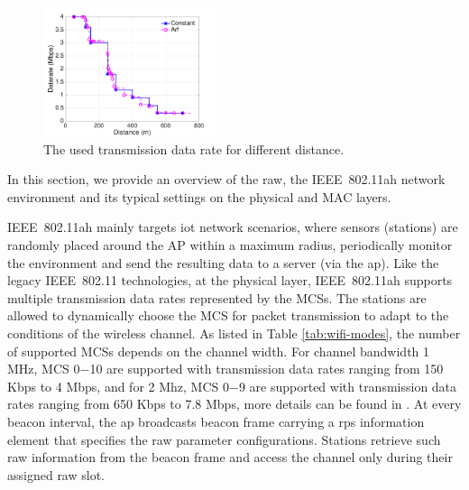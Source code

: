 \begin{figure}[t]
  \centering
  \includegraphics[width=0.45\textwidth]{figures/distance-datarate-512bytes}  \caption{The used transmission data rate for different distance. \label{fig:dist-datarate}}
\end{figure}

In this section, we provide an overview of the \gls{raw}, the IEEE~802.11ah network environment and its typical settings on the physical and MAC layers. 



IEEE~802.11ah mainly targets \gls{iot} network scenarios, where sensors (stations) are randomly placed around the AP within a maximum radius, periodically monitor the environment and send the resulting data to a server (via the \gls{ap}). Like the legacy IEEE~802.11 technologies, at the physical layer, IEEE~802.11ah supports multiple transmission data rates represented by the MCSs. The stations are allowed to dynamically choose the MCS for packet transmission to adapt to the conditions of the wireless channel. As listed in Table \ref{tab:wifi-modes}, the number of supported MCSs depends on the channel width. For channel bandwidth 1 MHz,  MCS 0$-$10 are supported with transmission data rates ranging from 150 Kbps to 4 Mbps, and for 2 Mhz, MCS 0$-$9 are supported with transmission data rates ranging from 650 Kbps to 7.8 Mbps, more details can be found in \cite{80211ahStd}. At every beacon interval, the \gls{ap} broadcasts beacon frame carrying a \gls{rps} information element that specifies the \gls{raw} parameter configurations. Stations retrieve such \gls{raw} information from the beacon frame and access the channel only during their assigned \gls{raw} slot. 



